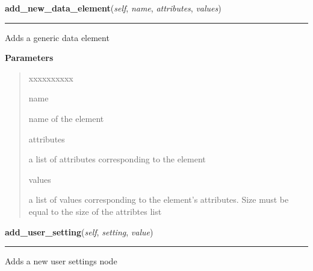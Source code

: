 \hspace{.8\funcindent}\begin{boxedminipage}{\funcwidth}

    \raggedright \textbf{add\_new\_data\_element}(\textit{self}, \textit{name}, \textit{attributes}, \textit{values})

    \vspace{-1.5ex}

    \rule{\textwidth}{0.5\fboxrule}
\setlength{\parskip}{2ex}
    Adds a generic data element

\setlength{\parskip}{1ex}
      \textbf{Parameters}
      \vspace{-1ex}

      \begin{quote}
        \begin{Ventry}{xxxxxxxxxx}

          \item[name]

          name of the element

          \item[attributes]

          a list of attributes corresponding to the element

          \item[values]

          a list of values corresponding to the element's attributes. Size 
          must be equal to the size of the attribtes list

        \end{Ventry}

      \end{quote}

    \end{boxedminipage}

    \label{XMLGenerator:XMLGenerator:add_user_setting}

    \vspace{0.5ex}

\hspace{.8\funcindent}\begin{boxedminipage}{\funcwidth}

    \raggedright \textbf{add\_user\_setting}(\textit{self}, \textit{setting}, \textit{value})

    \vspace{-1.5ex}

    \rule{\textwidth}{0.5\fboxrule}
\setlength{\parskip}{2ex}
    Adds a new user settings node

\setlength{\parskip}{1ex}
    \end{boxedminipage}


